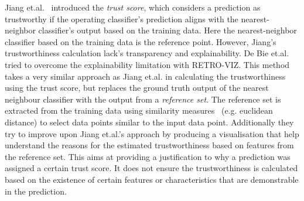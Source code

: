 Jiang et.al.~\cite{Jiang2018} introduced the \textit{trust score}, which considers a prediction as trustworthy if the operating classifier's prediction aligns with the nearest-neighbor classifier's output based on the training data. Here the nearest-neighbor classifier based on the training data is the reference point. However, Jiang's trustworthiness calculation lack's transparency and explainability.
%
De Bie et.al.~\cite{DeBie2021} tried to overcome the explainability limitation with RETRO-VIZ. This method takes a very similar approach as Jiang et.al.\cite{Jiang2018} in calculating the trustworthiness using the trust score, but replaces the ground truth output of the nearest neighbour classifier with the output from a \textit{reference set}. The reference set is extracted from the training data using similarity measures~\cite{Hond2020} (e.g. euclidean distance) to select data points similar to the input data point. 
%
Additionally they try to improve upon Jiang et.al.'s approach by producing a visualisation that help understand the reasons for the estimated trustworthiness based on features from the reference set. This aims at providing a justification to why a prediction was assigned a certain trust score. It does not ensure the trustworthiness is calculated based on the existence of certain features or characteristics that are demonstrable in the prediction.%

